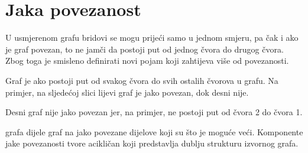 \chapter{Jaka povezanost}


U usmjerenom grafu
bridovi se mogu prijeći samo u jednom smjeru,
pa čak i ako je graf povezan,
to ne jamči da postoji
put od jednog čvora do drugog čvora.
Zbog toga je smisleno definirati novi pojam
koji zahtijeva više od povezanosti.

Graf je 
ako postoji put od svakog čvora do svih
ostalih čvorova u grafu.
Na primjer, na sljedećoj slici
lijevi graf je jako povezan,
dok desni nije.

\begin{center}
\end{center}

Desni graf nije jako povezan
jer, na primjer, ne postoji put
od čvora 2 do čvora 1.


grafa dijele graf na jako povezane
dijelove koji su što je moguće veći.
Komponente jake povezanosti tvore
acikličan  koji predstavlja
dublju strukturu izvornog grafa.

